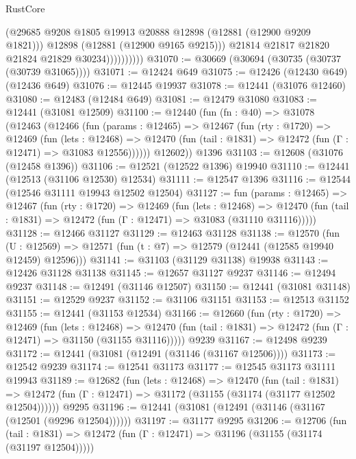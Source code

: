 \begin{lexlean}{RustCore}
\begin{coremodule}
                          (@29685 @9208 @1805 @19913 @20888 @12898 (@12881 (@12900 @9209 @1821)))
                          @12898
                          (@12881 (@12900 @9165 @9215)))
                        @21814
                        @21817
                        @21820
                        @21824
                        @21829
                        @30234))))))))))
@31070 := @30669 (@30694 (@30735 (@30737 (@30739 @31065))))
@31071 := @12424 @649
@31075 := @12426 (@12430 @649) (@12436 @649)
@31076 := @12445 @19937
@31078 := @12441 (@31076 @12460)
@31080 := @12483 (@12484 @649)
@31081 := @12479 @31080
@31083 := @12441 (@31081 @12509)
@31100 := @12440
    (fun (fn : @40) =>
    @31078
      (@12463
        (@12466
          (fun (params : @12465) =>
          @12467
            (fun (rty : @1720) =>
            @12469
              (fun (lets : @12468) =>
              @12470 (fun (tail : @1831) => @12472 (fun (Γ : @12471) => @31083 @12556))))))
        @12602))
    @1396
@31103 := @12608 (@31076 (@12458 @1396))
@31106 := @12521 (@12522 @1396) @19940
@31110 := @12441 (@12513 (@31106 @12530) @12534)
@31111 := @12547 @1396
@31116 := @12544 (@12546 @31111 @19943 @12502 @12504)
@31127 := fun (params : @12465) =>
  @12467
    (fun (rty : @1720) =>
    @12469
      (fun (lets : @12468) =>
      @12470 (fun (tail : @1831) => @12472 (fun (Γ : @12471) => @31083 (@31110 @31116)))))
@31128 := @12466 @31127
@31129 := @12463 @31128
@31138 := @12570
    (fun (U : @12569) => @12571 (fun (t : @7) => @12579 (@12441 (@12585 @19940 @12459) @12596)))
@31141 := @31103 (@31129 @31138) @19938
@31143 := @12426 @31128 @31138
@31145 := @12657 @31127 @9237
@31146 := @12494 @9237
@31148 := @12491 (@31146 @12507)
@31150 := @12441 (@31081 @31148)
@31151 := @12529 @9237
@31152 := @31106 @31151
@31153 := @12513 @31152
@31155 := @12441 (@31153 @12534)
@31166 := @12660
    (fun (rty : @1720) =>
    @12469
      (fun (lets : @12468) =>
      @12470 (fun (tail : @1831) => @12472 (fun (Γ : @12471) => @31150 (@31155 @31116)))))
    @9239
@31167 := @12498 @9239
@31172 := @12441 (@31081 (@12491 (@31146 (@31167 @12506))))
@31173 := @12542 @9239
@31174 := @12541 @31173
@31177 := @12545 @31173 @31111 @19943
@31189 := @12682
    (fun (lets : @12468) =>
    @12470
      (fun (tail : @1831) =>
      @12472 (fun (Γ : @12471) => @31172 (@31155 (@31174 (@31177 @12502 @12504))))))
    @9295
@31196 := @12441 (@31081 (@12491 (@31146 (@31167 (@12501 (@9296 @12504))))))
@31197 := @31177 @9295
@31206 := @12706
    (fun (tail : @1831) => @12472 (fun (Γ : @12471) => @31196 (@31155 (@31174 (@31197 @12504)))))

\end{coremodule}
\end{lexlean}
